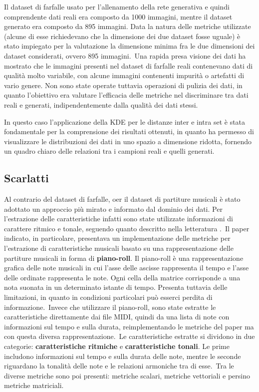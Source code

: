 Il dataset di farfalle usato per l'allenamento della rete generativa e quindi comprendente dati reali era composto da 1000 immagini, mentre il dataset generato era composto da 895 immagini. Data la natura delle metriche utilizzate (alcune di esse richiedevano che la dimensione dei due dataset fosse uguale) è stato impiegato per la valutazione la dimensione minima fra le due dimensioni dei dataset considerati, ovvero 895 immagini.\
Una rapida presa visione dei dati ha mostrato che le immagini presenti nel dataset di farfalle reali contenevano dati di qualità molto variabile, con alcune immagini contenenti impurità o artefatti di vario genere. Non sono state operate tuttavia operazioni di pulizia dei dati, in quanto l'obiettivo era valutare l'efficacia delle metriche nel discriminare tra dati reali e generati, indipendentemente dalla qualità dei dati stessi.

In questo caso l'applicazione della KDE per le distanze inter e intra set è stata fondamentale per la comprensione dei risultati ottenuti, in quanto ha permesso di visualizzare le distribuzioni dei dati in uno spazio a dimensione ridotta, fornendo un quadro chiaro delle relazioni tra i campioni reali e quelli generati.\

\subsection{Scarlatti}

Al contrario del dataset di farfalle, oer il dataset di partiture musicali è stato adottato un approccio più mirato e informato dal dominio dei dati. Per l'estrazione delle caratteristiche infatti sono state utilizzate informazioni di carattere ritmico e tonale, seguendo quanto descritto nella letteratura \cite{8OnTheEvaluationOfGenerativeModelsInMusic}.\
Il paper indicato, in particolare, presentava un implementazione delle metriche per l'estrazione di caratteristiche musicali basato su una rappresentazione delle partiture musicali in forma di \textbf{piano-roll}.
Il piano-roll è una rappresentazione grafica delle note musicali in cui l'asse delle ascisse rappresenta il tempo e l'asse delle ordinate rappresenta le note. Ogni cella della matrice corrisponde a una nota suonata in un determinato istante di tempo. Presenta tuttavia delle limitazioni, in quanto in condizioni particolari può esserci perdita di informazione.\
Invece che utilizzare il piano-roll, sono state estratte le caratteristiche direttamente dai file MIDI, quindi da una lista di note con informazioni sul tempo e sulla durata, reimplementando le metriche del paper ma con questa diversa rappresentazione.\
Le caratteristiche estratte si dividono in due categorie: \textbf{caratteristiche ritmiche} e \textbf{caratteristiche tonali}. Le prime includono informazioni sul tempo e sulla durata delle note, mentre le seconde riguardano la tonalità delle note e le relazioni armoniche tra di esse.\
Tra le diverse metriche sono poi presenti: metriche scalari, metriche vettoriali e persino metriche matriciali.\

